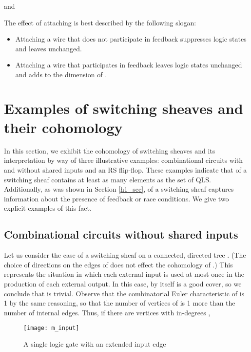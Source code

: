 \documentclass{amsart}
\theoremstyle{plain}
\theoremstyle{definition}
\begin{document}
and

The effect of attaching  is best described by the following slogan: 
\begin{itemize}
\item Attaching a wire that does not participate in feedback suppresses logic states and leaves  unchanged.
\item Attaching a wire that participates in feedback leaves logic states unchanged and adds to the dimension of .
\end{itemize}

\section{Examples of switching sheaves and their cohomology}
\label{example_sec}

In this section, we exhibit the cohomology of switching sheaves and its interpretation by way of  three illustrative examples: combinational circuits with and without shared inputs and an RS flip-flop.  These examples indicate that  of a switching sheaf contains at least as many elements as the set of QLS.  Additionally, as was shown in Section \ref{h1_sec},  of a switching sheaf captures information about the presence of feedback or race conditions.  We give two explicit examples of this fact.

\subsection{Combinational circuits without shared inputs}

Let us consider the case of a switching sheaf  on a
connected, directed tree .  (The choice of directions on the edges
of  does not effect the cohomology of .)  This
represents the situation in which each external input is used at most
once in the production of each external output.  In this case, 
by itself is a good cover, so we conclude that  is
trivial.  Observe that the combinatorial Euler characteristic of 
is 1 by the same reasoning, so that the number of vertices of  is 1
more than the number of internal edges.  Thus, if there are  vertices with in-degrees ,


\begin{figure}
\begin{center}
\texttt{[image: m\_input]}
\caption{A single logic gate with an extended input edge}
\label{m_input_fig}
\end{center}
\end{figure}
\end{document}
